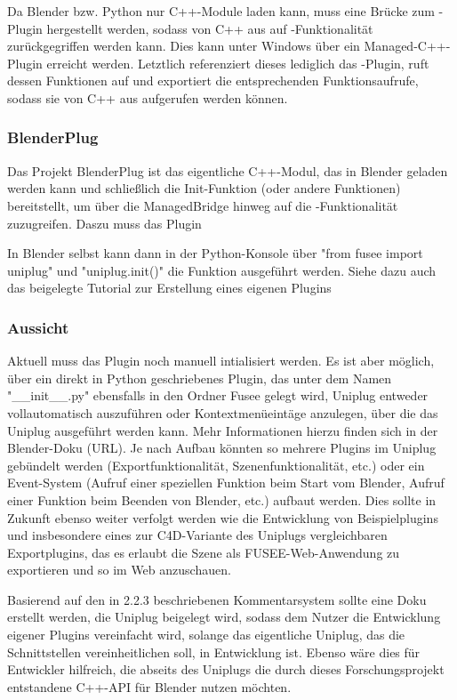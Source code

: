 Da Blender bzw. Python nur C++-Module laden kann, muss eine Brücke zum \CS{}-Plugin hergestellt werden, sodass von C++ aus auf \CS{}-Funktionalität zurückgegriffen werden kann. Dies kann unter Windows über ein Managed-C++-Plugin erreicht werden. Letztlich referenziert dieses lediglich das \CS{}-Plugin, ruft dessen Funktionen auf und exportiert die entsprechenden Funktionsaufrufe, sodass sie von C++ aus aufgerufen werden können.

\subsubsection{BlenderPlug}

Das Projekt BlenderPlug ist das eigentliche C++-Modul, das in Blender geladen werden kann und schließlich die Init-Funktion (oder andere Funktionen) bereitstellt, um über die ManagedBridge hinweg auf die \CS{}-Funktionalität zuzugreifen.  Daszu muss das Plugin 

In Blender selbst kann dann in der Python-Konsole über "from fusee import uniplug" und "uniplug.init()" die Funktion ausgeführt werden. Siehe dazu auch das beigelegte Tutorial zur Erstellung eines eigenen Plugins

\subsubsection{Aussicht}

Aktuell muss das Plugin noch manuell intialisiert werden. Es ist aber möglich, über ein direkt in Python geschriebenes Plugin, das unter dem Namen "\_\_init\_\_.py" ebensfalls in den Ordner Fusee gelegt wird, Uniplug entweder vollautomatisch auszuführen oder Kontextmenüeintäge anzulegen, über die das Uniplug ausgeführt werden kann. Mehr Informationen hierzu finden sich in der Blender-Doku (URL). Je nach Aufbau könnten so mehrere Plugins im Uniplug gebündelt werden (Exportfunktionalität, Szenenfunktionalität, etc.) oder ein Event-System (Aufruf einer speziellen Funktion beim Start vom Blender, Aufruf einer Funktion beim Beenden von Blender, etc.) aufbaut werden. Dies sollte in Zukunft ebenso weiter verfolgt werden wie die Entwicklung von Beispielplugins und insbesondere eines zur C4D-Variante des Uniplugs vergleichbaren Exportplugins, das es erlaubt die Szene als FUSEE-Web-Anwendung zu exportieren und so im Web anzuschauen.

Basierend auf den in 2.2.3 beschriebenen Kommentarsystem sollte eine Doku erstellt werden, die Uniplug beigelegt wird, sodass dem Nutzer die Entwicklung eigener Plugins vereinfacht wird, solange das eigentliche Uniplug, das die Schnittstellen vereinheitlichen soll, in Entwicklung ist. Ebenso wäre dies für Entwickler hilfreich, die abseits des Uniplugs die durch dieses Forschungsprojekt entstandene C++-API für Blender nutzen möchten.

